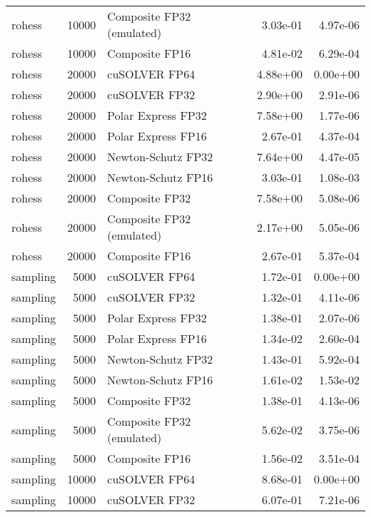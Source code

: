 \begin{table}
\begin{tabular}{lrlrr}
   rohess & 10000 & Composite FP32 (emulated) &  3.03e-01 &        4.97e-06 \\
   rohess & 10000 &            Composite FP16 &  4.81e-02 &        6.29e-04 \\
   rohess & 20000 &             cuSOLVER FP64 &  4.88e+00 &        0.00e+00 \\
   rohess & 20000 &             cuSOLVER FP32 &  2.90e+00 &        2.91e-06 \\
   rohess & 20000 &        Polar Express FP32 &  7.58e+00 &        1.77e-06 \\
   rohess & 20000 &        Polar Express FP16 &  2.67e-01 &        4.37e-04 \\
   rohess & 20000 &        Newton-Schutz FP32 &  7.64e+00 &        4.47e-05 \\
   rohess & 20000 &        Newton-Schutz FP16 &  3.03e-01 &        1.08e-03 \\
   rohess & 20000 &            Composite FP32 &  7.58e+00 &        5.08e-06 \\
   rohess & 20000 & Composite FP32 (emulated) &  2.17e+00 &        5.05e-06 \\
   rohess & 20000 &            Composite FP16 &  2.67e-01 &        5.37e-04 \\
 sampling &  5000 &             cuSOLVER FP64 &  1.72e-01 &        0.00e+00 \\
 sampling &  5000 &             cuSOLVER FP32 &  1.32e-01 &        4.11e-06 \\
 sampling &  5000 &        Polar Express FP32 &  1.38e-01 &        2.07e-06 \\
 sampling &  5000 &        Polar Express FP16 &  1.34e-02 &        2.60e-04 \\
 sampling &  5000 &        Newton-Schutz FP32 &  1.43e-01 &        5.92e-04 \\
 sampling &  5000 &        Newton-Schutz FP16 &  1.61e-02 &        1.53e-02 \\
 sampling &  5000 &            Composite FP32 &  1.38e-01 &        4.13e-06 \\
 sampling &  5000 & Composite FP32 (emulated) &  5.62e-02 &        3.75e-06 \\
 sampling &  5000 &            Composite FP16 &  1.56e-02 &        3.51e-04 \\
 sampling & 10000 &             cuSOLVER FP64 &  8.68e-01 &        0.00e+00 \\
 sampling & 10000 &             cuSOLVER FP32 &  6.07e-01 &        7.21e-06 \\

\end{tabular}
\end{table}
